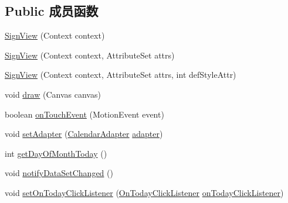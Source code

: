 \subsection*{Public 成员函数}
\begin{DoxyCompactItemize}
\item 
\mbox{\hyperlink{classcom_1_1example_1_1akisame__lin_1_1love__air2_1_1_bean_1_1_sign_view_a7eb7f73836001c43c61d190f1444e662}{Sign\+View}} (Context context)
\item 
\mbox{\hyperlink{classcom_1_1example_1_1akisame__lin_1_1love__air2_1_1_bean_1_1_sign_view_a7c5f4a87215e73787a292ac80626453b}{Sign\+View}} (Context context, Attribute\+Set attrs)
\item 
\mbox{\hyperlink{classcom_1_1example_1_1akisame__lin_1_1love__air2_1_1_bean_1_1_sign_view_af080156f2242ae527d8b93f4e2e0abda}{Sign\+View}} (Context context, Attribute\+Set attrs, int def\+Style\+Attr)
\item 
void \mbox{\hyperlink{classcom_1_1example_1_1akisame__lin_1_1love__air2_1_1_bean_1_1_sign_view_a79265f2ea8030a10c5ac384932b28f54}{draw}} (Canvas canvas)
\item 
boolean \mbox{\hyperlink{classcom_1_1example_1_1akisame__lin_1_1love__air2_1_1_bean_1_1_sign_view_a4c103b9944eff028b0369a62e06cba80}{on\+Touch\+Event}} (Motion\+Event event)
\item 
void \mbox{\hyperlink{classcom_1_1example_1_1akisame__lin_1_1love__air2_1_1_bean_1_1_sign_view_a7ed83c719616cb5b57de949c45da4c62}{set\+Adapter}} (\mbox{\hyperlink{classcom_1_1example_1_1akisame__lin_1_1love__air2_1_1presenter_1_1_calendar_adapter}{Calendar\+Adapter}} \mbox{\hyperlink{classcom_1_1example_1_1akisame__lin_1_1love__air2_1_1_bean_1_1_sign_view_a3bbef22a82afa7a83198ab3b85fbee3c}{adapter}})
\item 
int \mbox{\hyperlink{classcom_1_1example_1_1akisame__lin_1_1love__air2_1_1_bean_1_1_sign_view_a66bf718dcf056df98f9da450a17a4448}{get\+Day\+Of\+Month\+Today}} ()
\item 
void \mbox{\hyperlink{classcom_1_1example_1_1akisame__lin_1_1love__air2_1_1_bean_1_1_sign_view_a6b6a89d11a621f13a0f6bfa8b939ff97}{notify\+Data\+Set\+Changed}} ()
\item 
void \mbox{\hyperlink{classcom_1_1example_1_1akisame__lin_1_1love__air2_1_1_bean_1_1_sign_view_a2af080ad00497044e0c2526ee24f306f}{set\+On\+Today\+Click\+Listener}} (\mbox{\hyperlink{interfacecom_1_1example_1_1akisame__lin_1_1love__air2_1_1_bean_1_1_sign_view_1_1_on_today_click_listener}{On\+Today\+Click\+Listener}} \mbox{\hyperlink{classcom_1_1example_1_1akisame__lin_1_1love__air2_1_1_bean_1_1_sign_view_ab7203231ddb3a8339dcb22bea4fd10df}{on\+Today\+Click\+Listener}})
\end{DoxyCompactItemize}
